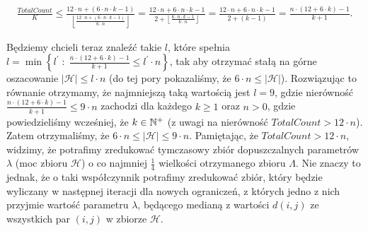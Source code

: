 \begin{gather*}
	\frac{TotalCount}{K} \leqslant \frac{12 \cdot n + \left( 6 \cdot n \cdot k - 1 \right)}{\left\lfloor \frac{12 \cdot n + \left( 6 \cdot n \cdot k - 1 \right)}{6 \cdot n} \right\rfloor} = \frac{12 \cdot n + 6 \cdot n \cdot k - 1}{2 + \left\lfloor \frac{6 \cdot n \cdot k - 1}{6 \cdot n} \right\rfloor} = \frac{12 \cdot n + 6 \cdot n \cdot k - 1}{2 + \left( k - 1\right)} = \frac{n \cdot \left( 12 + 6 \cdot k \right) - 1}{k + 1}\text{.}
\end{gather*}

Będziemy chcieli teraz znaleźć takie $l$, które spełnia $l = \min \left\{ l^{\prime} \; : \; \frac{n \cdot \left( 12 + 6 \cdot k \right) - 1}{k + 1} \leqslant l^{\prime} \cdot n \right\}$, tak aby otrzymać stałą na górne oszacowanie $\left| \mathcal{H} \right| \leqslant l \cdot n$ (do tej pory pokazaliśmy, że $6 \cdot n \leqslant \left| \mathcal{H} \right|$). Rozwiązując to równanie otrzymamy, że najmniejszą taką wartością jest $l = 9$, gdzie nierówność $\frac{n \cdot \left( 12 + 6 \cdot k \right) - 1}{k + 1} \leqslant 9 \cdot n$ zachodzi dla każdego $k \geqslant 1$ oraz $n > 0$, gdzie powiedzieliśmy wcześniej, że $k \in \mathbb{N}^{+}$ (z uwagi na nierówność $TotalCount > 12 \cdot n$). Zatem otrzymaliśmy, że $6 \cdot n \leqslant \left| \mathcal{H} \right| \leqslant 9 \cdot n$. Pamiętając, że $TotalCount > 12 \cdot n$, widzimy, że potrafimy zredukować tymczasowy zbiór dopuszczalnych parametrów $\lambda$ (moc zbioru $\mathcal{H}$) o co najmniej $\frac{1}{4}$ wielkości otrzymanego zbioru $\Lambda$. Nie znaczy to jednak, że o taki współczynnik potrafimy zredukować zbiór, który będzie wyliczany w następnej iteracji dla nowych ograniczeń, z których jedno z nich przyjmie wartość parametru $\lambda$, będącego medianą z wartości $d \left( i, j \right)$ ze wszystkich par $\left( i, j \right)$ w zbiorze $\mathcal{H}$.

